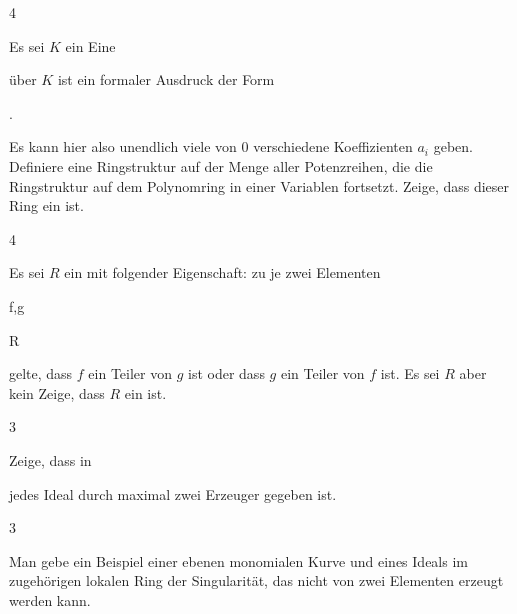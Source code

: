 {} {}



{4}

{


Es sei $K$ ein
Eine

 über $K$ ist ein formaler Ausdruck der Form


 { . }


Es kann hier also unendlich viele von $0$ verschiedene Koeffizienten $a_i$ geben. Definiere eine Ringstruktur auf der Menge aller Potenzreihen, die die Ringstruktur auf dem Polynomring in einer Variablen fortsetzt. Zeige, dass dieser Ring ein
ist.


}

{} {}



{4}

{


Es sei $R$ ein
mit folgender Eigenschaft: zu je zwei Elementen


\mavergleichskette

{\vergleichskette

{ f,g
}

{ \in }{ R
}

{  }{
}

{    }{
}

{   }{
}

}
{}{}{}
gelte, dass $f$ ein Teiler von $g$ ist oder dass $g$ ein Teiler von $f$ ist. Es sei $R$
aber kein
Zeige, dass $R$ ein
ist.


}

{} {}



{3}

{


Zeige, dass in

 jedes Ideal durch maximal zwei Erzeuger gegeben ist.


}

{} {}



{3}

{


Man gebe ein Beispiel einer ebenen monomialen Kurve und eines Ideals im zugehörigen lokalen Ring der Singularität, das nicht von zwei Elementen erzeugt werden kann.


}

{} {}

